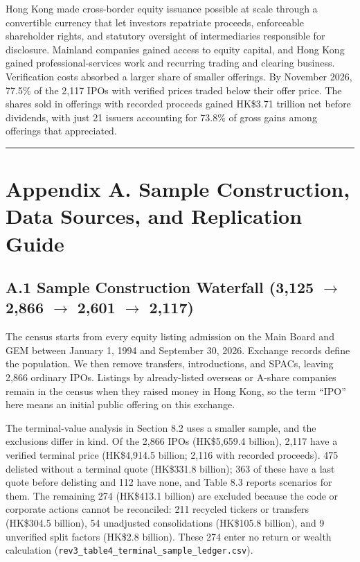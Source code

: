 \documentclass[11pt,letterpaper]{article}
\begin{document}
Hong Kong made cross-border equity issuance possible at scale through a convertible currency that let investors repatriate proceeds, enforceable shareholder rights, and statutory oversight of intermediaries responsible for disclosure. Mainland companies gained access to equity capital, and Hong Kong gained professional-services work and recurring trading and clearing business. Verification costs absorbed a larger share of smaller offerings. By November 2026, 77.5\% of the 2,117 IPOs with verified prices traded below their offer price. The shares sold in offerings with recorded proceeds gained HK\$3.71 trillion net before dividends, with just 21 issuers accounting for 73.8\% of gross gains among offerings that appreciated.

\par\medskip\noindent\rule{\linewidth}{0.35pt}\par\medskip
\section*{\texorpdfstring{Appendix A. Sample Construction, Data Sources, and Replication Guide}{Appendix A. Sample Construction, Data Sources, and Replication Guide}}
\subsection*{\texorpdfstring{A.1 Sample Construction Waterfall (3,125 $\to$ 2,866 $\to$ 2,601 $\to$ 2,117)}{A.1 Sample Construction Waterfall (3,125 $\to$ 2,866 $\to$ 2,601 $\to$ 2,117)}}
The census starts from every equity listing admission on the Main Board and GEM between January 1, 1994 and September 30, 2026. Exchange records define the population. We then remove transfers, introductions, and SPACs, leaving 2,866 ordinary IPOs. Listings by already-listed overseas or A-share companies remain in the census when they raised money in Hong Kong, so the term ``IPO'' here means an initial public offering on this exchange.

The terminal-value analysis in Section 8.2 uses a smaller sample, and the exclusions differ in kind. Of the 2,866 IPOs (HK\$5,659.4 billion), 2,117 have a verified terminal price (HK\$4,914.5 billion; 2,116 with recorded proceeds). 475 delisted without a terminal quote (HK\$331.8 billion); 363 of these have a last quote before delisting and 112 have none, and Table 8.3 reports scenarios for them. The remaining 274 (HK\$413.1 billion) are excluded because the code or corporate actions cannot be reconciled: 211 recycled tickers or transfers (HK\$304.5 billion), 54 unadjusted consolidations (HK\$105.8 billion), and 9 unverified split factors (HK\$2.8 billion). These 274 enter no return or wealth calculation (\texttt{\small rev3\_\allowbreak{}table4\_\allowbreak{}terminal\_\allowbreak{}sample\_\allowbreak{}ledger.csv}).
\end{document}
